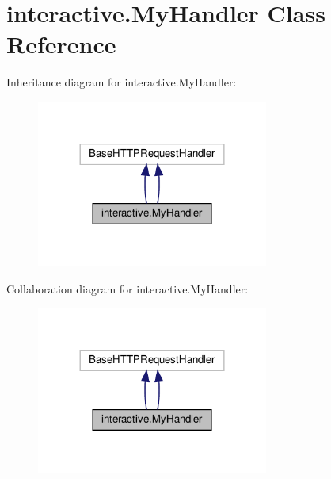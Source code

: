 \hypertarget{classinteractive_1_1MyHandler}{}\section{interactive.\+My\+Handler Class Reference}
\label{classinteractive_1_1MyHandler}


Inheritance diagram for interactive.\+My\+Handler\+:
\nopagebreak
\begin{figure}[H]
\begin{center}
\leavevmode
\includegraphics[width=216pt]{classinteractive_1_1MyHandler__inherit__graph}
\end{center}
\end{figure}


Collaboration diagram for interactive.\+My\+Handler\+:
\nopagebreak
\begin{figure}[H]
\begin{center}
\leavevmode
\includegraphics[width=216pt]{classinteractive_1_1MyHandler__coll__graph}
\end{center}
\end{figure}
